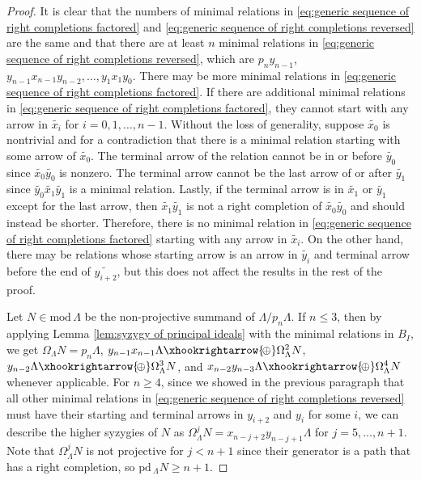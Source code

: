 \documentclass{conm-p-l}
\newcommand{\pd}{\mathrm{pd}\,}
\renewcommand{\mod}{\mathrm{mod}\,}
\newcommand{\dirsum}{\xhookrightarrow{\!\oplus}}
\theoremstyle{definition}
\theoremstyle{remark}
\numberwithin{equation}{section}
\begin{document}
\begin{proof}
It is clear that the numbers of minimal relations in \eqref{eq:generic sequence of right completions factored} and \eqref{eq:generic sequence of right completions reversed} are the same and that there are at least $n$ minimal relations in \eqref{eq:generic sequence of right completions reversed}, which are $p_ny_{n-1}$, $y_{n-1}x_{n-1}y_{n-2}, \dots, y_1x_1y_0$. There may be more minimal relations in \eqref{eq:generic sequence of right completions factored}. If there are additional minimal relations in \eqref{eq:generic sequence of right completions factored}, they cannot start with any arrow in $\widetilde{x_i}$ for $i=0,1,\dots,n-1$. Without the loss of generality, suppose $\widetilde{x_0}$ is nontrivial and for a contradiction that there is a minimal relation starting with some arrow of $\widetilde{x_0}$. The terminal arrow of the relation cannot be in or before $\widetilde{y_0}$ since $\widetilde{x_0}\widetilde{y_0}$ is nonzero. The terminal arrow cannot be the last arrow of or after $\widetilde{y_1}$ since $\widetilde{y_0}\widetilde{x_1}\widetilde{y_1}$ is a minimal relation. Lastly, if the terminal arrow is in $\widetilde{x_1}$ or $\widetilde{y_1}$ except for the last arrow, then $\widetilde{x_1}\widetilde{y_1}$ is not a right completion of $\widetilde{x_0}\widetilde{y_0}$ and should instead be shorter. Therefore, there is no minimal relation in \eqref{eq:generic sequence of right completions factored} starting with any arrow in $\widetilde{x_i}$. On the other hand, there may be relations whose starting arrow is an arrow in $\widetilde{y_i}$ and terminal arrow before the end of $\widetilde{y_{i+2}}$, but this does not affect the results in the rest of the proof.

Let $N\in\mod\Lambda$ be the non-projective summand of $\Lambda/p_n\Lambda$. If $n\leq 3$, then by applying Lemma \ref{lem:syzygy of principal ideals} with the minimal relations in $B_I$, we get $\Omega_{\Lambda} N = p_n\Lambda$, $ y_{n-1}x_{n-1}\Lambda \dirsum \Omega_{\Lambda}^2 N$, $y_{n-2}\Lambda \dirsum \Omega_{\Lambda}^3 N$, and $x_{n-2}y_{n-3}\Lambda \dirsum \Omega_{\Lambda}^4 N$ whenever applicable. For $n\geq 4$, since we showed in the previous paragraph that all other minimal relations in \eqref{eq:generic sequence of right completions reversed} must have their starting and terminal arrows in $y_{i+2}$ and $y_i$ for some $i$, we can describe the higher syzygies of $N$ as $\Omega^j_{\Lambda} N = x_{n-j+2}y_{n-j+1}\Lambda$ for $j=5,\dots,n+1$. Note that $\Omega^j_{\Lambda} N$ is not projective for $j<n+1$ since their generator is a path that has a right completion, so $\pd\!_{\Lambda} N \geq n+1$.
\end{proof}
\end{document}
